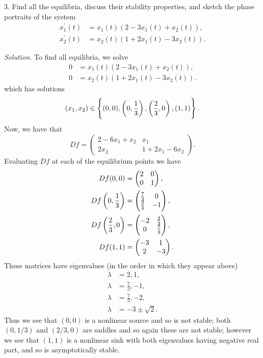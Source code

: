 \documentclass{article}
\begin{document}
\newpage

3. Find all the equilibria, discuss their stability properties, and sketch the phase
portraits of the system
%
\begin{align*}
    x_1^\prime(t) &= x_1(t) (2 - 3 x_1(t) + x_2(t)), \\
    x_2^\prime(t) &= x_2(t) (1 + 2 x_1(t) - 3 x_2(t)).
\end{align*}

\textit{Solution.}
To find all equilibria, we solve
%
\begin{align*}
    0 &= x_1(t) (2 - 3 x_1(t) + x_2(t)), \\
    0 &= x_2(t) (1 + 2 x_1(t) - 3 x_2(t)).
\end{align*}
%
which has solutions
%
\begin{equation*}
    (x_1, x_2) \in \cbr{(0, 0), \del{0, \frac{1}{3}}, \del{\frac{2}{3}, 0}, (1, 1)}
    .
\end{equation*}
%
Now, we have that
%
\begin{equation*}
    Df =
    \begin{pmatrix}
        2 - 6 x_1 + x_2 & x_1 \\
        2 x_2 & 1 + 2 x_1 - 6 x_2
    \end{pmatrix}
    .
\end{equation*}
%
Evaluating $Df$ at each of the equilibrium points we have
%
\begin{align*}
    Df(0, 0) &=
    \begin{pmatrix}
        2 & 0 \\
        0 & 1
    \end{pmatrix}
    ,
    \\
    Df\del{0, \frac{1}{3}} &=
    \begin{pmatrix}
        \frac{7}{3} & 0 \\
        \frac{2}{3} & -1
    \end{pmatrix}
    ,
    \\
    Df\del{\frac{2}{3}, 0} &=
    \begin{pmatrix}
        -2 & \frac{2}{3} \\
        0 & \frac{7}{3}
    \end{pmatrix}
    ,
    \\
    Df(1, 1) &=
    \begin{pmatrix}
        - 3 & 1 \\
        2 & - 3
    \end{pmatrix}
    .
\end{align*}
%
These matrices have eigenvalues (in the order in which they appear above)
%
\begin{align*}
    \lambda &= 2, 1, \\
    \lambda &= \frac{7}{3}, -1, \\
    \lambda &= \frac{7}{3}, -2, \\
    \lambda &= -3 \pm \sqrt{2}.
\end{align*}
%
Thus we see that $(0, 0)$ is a nonlinear source and so is not stable; both
$(0, 1/3)$ and $(2/3, 0)$ are saddles and so again these are not stable;
however we see that $(1, 1)$ is a nonlinear sink with both eigenvalues having
negative real part, and so is asymptotically stable.
\end{document}
